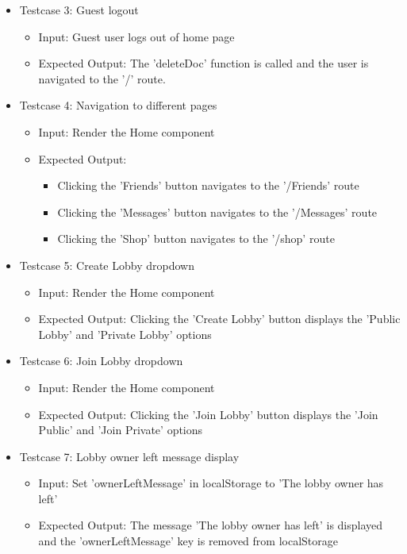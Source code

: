 \begin{itemize}
    \item Testcase 3: Guest logout
    \begin{itemize}
        \item Input: Guest user logs out of home page
        \item Expected Output: The 'deleteDoc' function is called and the user is navigated to the '/' route.
    \end{itemize}
    
    \item Testcase 4: Navigation to different pages
    \begin{itemize}
        \item Input: Render the Home component
        \item Expected Output:
            \begin{itemize}
                \item Clicking the 'Friends' button navigates to the '/Friends' route
                \item Clicking the 'Messages' button navigates to the '/Messages' route
                \item Clicking the 'Shop' button navigates to the '/shop' route
            \end{itemize}
    \end{itemize}

    \item Testcase 5: Create Lobby dropdown
    \begin{itemize}
        \item Input: Render the Home component
        \item Expected Output: Clicking the 'Create Lobby' button displays the 'Public Lobby' and 'Private Lobby' options
    \end{itemize}
    
    \item Testcase 6: Join Lobby dropdown
    \begin{itemize}
        \item Input: Render the Home component
        \item Expected Output: Clicking the 'Join Lobby' button displays the 'Join Public' and 'Join Private' options
    \end{itemize}
    
    \item Testcase 7: Lobby owner left message display
    \begin{itemize}
        \item Input: Set 'ownerLeftMessage' in localStorage to 'The lobby owner has left'
        \item Expected Output: The message 'The lobby owner has left' is displayed and the 'ownerLeftMessage' key is removed from localStorage
    \end{itemize}
    

\end{itemize}
